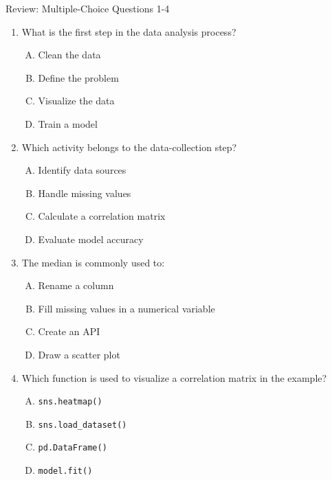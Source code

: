 \documentclass[aspectratio=169,11pt]{beamer}
\begin{document}
\begin{frame}{Review: Multiple-Choice Questions 1-4}
\begin{enumerate}\scriptsize
  \item What is the first step in the data analysis process?
  \begin{enumerate}[A.]\scriptsize
    \item Clean the data \item Define the problem \item Visualize the data \item Train a model
  \end{enumerate}
  \item Which activity belongs to the data-collection step?
  \begin{enumerate}[A.]\scriptsize
    \item Identify data sources \item Handle missing values \item Calculate a correlation matrix \item Evaluate model accuracy
  \end{enumerate}
  \item The median is commonly used to:
  \begin{enumerate}[A.]\scriptsize
    \item Rename a column \item Fill missing values in a numerical variable \item Create an API \item Draw a scatter plot
  \end{enumerate}
  \item Which function is used to visualize a correlation matrix in the example?
  \begin{enumerate}[A.]\scriptsize
    \item \texttt{sns.heatmap()} \item \texttt{sns.load\_dataset()} \item \texttt{pd.DataFrame()} \item \texttt{model.fit()}
  \end{enumerate}
\end{enumerate}
\end{frame}
\end{document}
